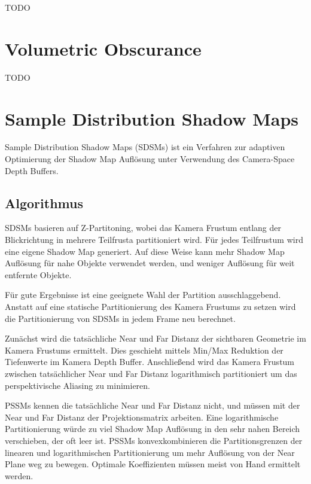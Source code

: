 \documentclass[runningheaders,a4paper]{llncs}
\begin{document}
	TODO

\section{Volumetric Obscurance}

	TODO

\section{Sample Distribution Shadow Maps}

Sample Distribution Shadow Maps (SDSMs) ist ein Verfahren zur adaptiven Optimierung der Shadow Map Auflösung unter Verwendung des Camera-Space Depth Buffers.

\subsection{Algorithmus}

SDSMs basieren auf Z-Partitoning, wobei das Kamera Frustum entlang der Blickrichtung in mehrere Teilfrusta partitioniert wird. Für jedes Teilfrustum wird eine eigene Shadow Map generiert.
Auf diese Weise kann mehr Shadow Map Auflösung für nahe Objekte verwendet werden, und weniger Auflösung für weit entfernte Objekte.

Für gute Ergebnisse ist eine geeignete Wahl der Partition ausschlaggebend.
Anstatt auf eine statische Partitionierung des Kamera Frustums zu setzen wird die Partitionierung von SDSMs in jedem Frame neu berechnet.

Zunächst wird die tatsächliche Near und Far Distanz der sichtbaren Geometrie im Kamera Frustums ermittelt. Dies geschieht mittels Min/Max Reduktion der Tiefenwerte im Kamera Depth Buffer.
Anschließend wird das Kamera Frustum zwischen tatsächlicher Near und Far Distanz logarithmisch partitioniert um das perspektivische Aliasing zu minimieren.

PSSMs kennen die tatsächliche Near und Far Distanz nicht, und müssen mit der Near und Far Distanz der Projektionsmatrix arbeiten.
Eine logarithmische Partitionierung würde zu viel Shadow Map Auflösung in den sehr nahen Bereich verschieben, der oft leer ist.
PSSMs konvexkombinieren die Partitionsgrenzen der linearen und logarithmischen Partitionierung um mehr Auflösung von der Near Plane weg zu bewegen.
Optimale Koeffizienten müssen meist von Hand ermittelt werden.
\end{document}
